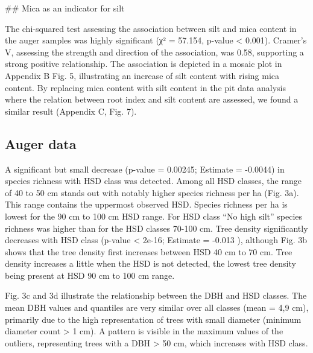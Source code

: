 \documentclass[fleqn,12pt]{latex/stylish_article} %
\begin{document}
\normalsize
\#\# Mica as an indicator for silt

The chi-squared test assessing the association between silt and mica content in the auger samples was highly significant (χ² = 57.154, p-value \textless{} 0.001). Cramer's V, assessing the strength and direction of the association, was 0.58, supporting a strong positive relationship. The association is depicted in a mosaic plot in Appendix B Fig. 5, illustrating an increase of silt content with rising mica content. By replacing mica content with silt content in the pit data analysis where the relation between root index and silt content are assessed, we found a similar result (Appendix C, Fig. 7).

\hypertarget{auger-data}{%
\subsection{Auger data}\label{auger-data}}

A significant but small decrease (p-value = 0.00245; Estimate = -0.0044) in species richness with HSD class was detected. Among all HSD classes, the range of 40 to 50 cm stands out with notably higher species richness per ha (Fig. 3a). This range contains the uppermost observed HSD. Species richness per ha is lowest for the 90 cm to 100 cm HSD range. For HSD class \enquote{No high silt} species richness was higher than for the HSD classes 70-100 cm. Tree density significantly decreases with HSD class (p-value \textless{} 2e-16; Estimate = -0.013 ), although Fig. 3b shows that the tree density first increases between HSD 40 cm to 70 cm. Tree density increases a little when the HSD is not detected, the lowest tree density being present at HSD 90 cm to 100 cm range.

Fig. 3c and 3d illustrate the relationship between the DBH and HSD classes. The mean DBH values and quantiles are very similar over all classes (mean = 4,9 cm), primarily due to the high representation of trees with small diameter (minimum diameter count \textgreater{} 1 cm). A pattern is visible in the maximum values of the outliers, representing trees with a DBH \textgreater{} 50 cm, which increases with HSD class.



\scriptsize
\end{document}
